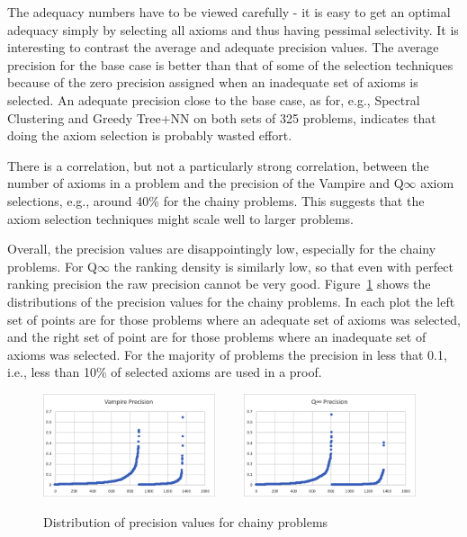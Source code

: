 \documentclass[]{ceurart}
\begin{document}
The adequacy numbers have to be viewed carefully - it is easy to get an
optimal adequacy simply by selecting all axioms and thus having pessimal
selectivity.
It is interesting to contrast the average and adequate precision values.
The average precision for the base case is better than that of some of the
selection techniques because of the zero precision assigned when an inadequate
set of axioms is selected.
An adequate precision close to the base case, as for, e.g., Spectral 
Clustering and Greedy Tree+NN on both sets of 325 problems,
indicates that doing the axiom selection is probably wasted effort.

There is a correlation, but not a particularly strong correlation, between 
the number of axioms in a problem and the precision of the Vampire and 
Q$\infty$ axiom selections, e.g., around 40\% for the chainy problems.
This suggests that the axiom selection techniques might scale well to
larger problems.

Overall, the precision values are disappointingly low, especially for the
chainy problems.
For Q$\infty$ the ranking density is similarly low, so that even with perfect
ranking precision the raw precision cannot be very good.
Figure~\ref{fig:PrcnChainy} shows the distributions of the precision values
for the chainy problems.
In each plot the left set of points are for those problems where an adequate
set of axioms was selected, and the right set of point are for those problems
where an inadequate set of axioms was selected.
For the majority of problems the precision in less that 0.1, i.e., less than
10\% of selected axioms are used in a proof.

\begin{figure}
\centering
\includegraphics[width=0.45\textwidth]{PrcnChainyVampire.png}~~~~
\includegraphics[width=0.45\textwidth]{PrcnChainyQinf.png}
\caption{Distribution of precision values for chainy problems}
\label{fig:PrcnChainy}
\end{figure}
\end{document}
